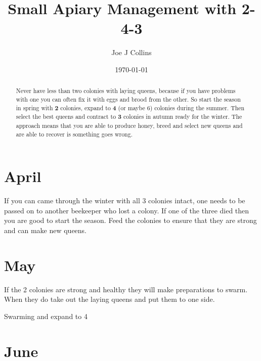 \documentclass{article}
\title{Small Apiary Management with \textbf{2-4-3} }
\author{Joe J Collins}
\date{\today}
\begin{document}
\maketitle

\begin{abstract}
Never have less than two colonies with laying queens,
because if you have problems with one you can often
fix it with eggs and brood from the other.
So start the season in spring with \textbf{2} colonies,
expand to \textbf{4} (or maybe 6) colonies during the summer.
Then select the best queens
and contract to \textbf{3} colonies in autumn ready for the winter.
The approach means that you are able to produce honey,
breed and select new queens and
are able to recover is something goes wrong.
\end{abstract}

\section{April}

If you can came through the winter with all 3 colonies intact,
one needs to be passed on to another beekeeper who lost a colony.
If one of the three died then you are good to start the season.
Feed the colonies to ensure that they are strong and can make new queens.

\section{May}

If the 2 colonies are strong and healthy they will make preparations to swarm.
When they do take out the laying queens and put them to one side.

Swarming and expand to 4

\section{June}
\end{document}

